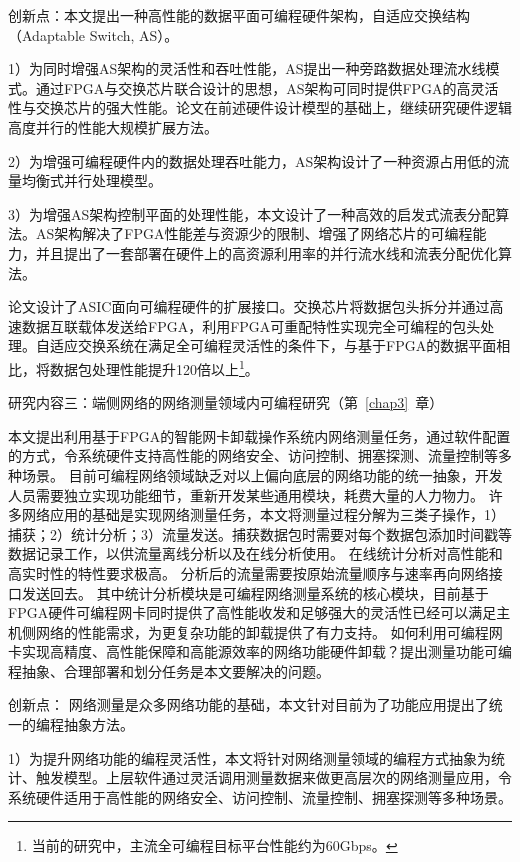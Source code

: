{\hei 创新点：}本文提出一种高性能的数据平面可编程硬件架构，自适应交换结构（Adaptable Switch, AS）。

1）为同时增强AS架构的灵活性和吞吐性能，AS提出一种旁路数据处理流水线模式。通过FPGA与交换芯片联合设计的思想，AS架构可同时提供FPGA的高灵活性与交换芯片的强大性能。论文在前述硬件设计模型的基础上，继续研究硬件逻辑高度并行的性能大规模扩展方法。

2）为增强可编程硬件内的数据处理吞吐能力，AS架构设计了一种资源占用低的流量均衡式并行处理模型。

3）为增强AS架构控制平面的处理性能，本文设计了一种高效的启发式流表分配算法。AS架构解决了FPGA性能差与资源少的限制、增强了网络芯片的可编程能力，并且提出了一套部署在硬件上的高资源利用率的并行流水线和流表分配优化算法。

论文设计了ASIC面向可编程硬件的扩展接口。交换芯片将数据包头拆分并通过高速数据互联载体发送给FPGA，利用FPGA可重配特性实现完全可编程的包头处理。自适应交换系统在满足全可编程灵活性的条件下，与基于FPGA的数据平面相比，将数据包处理性能提升120倍以上\footnote{当前的研究中，主流全可编程目标平台性能约为60Gbps。}。

{\hei 研究内容三：端侧网络的网络测量领域内可编程研究（第~\ref{chap3}~章）}

{\hei 本文提出利用基于FPGA的智能网卡卸载操作系统内网络测量任务，通过软件配置的方式，令系统硬件支持高性能的网络安全、访问控制、拥塞探测、流量控制等多种场景。}
目前可编程网络领域缺乏对以上偏向底层的网络功能的统一抽象，开发人员需要独立实现功能细节，重新开发某些通用模块，耗费大量的人力物力。
许多网络应用的基础是实现网络测量任务，本文将测量过程分解为三类子操作，1）捕获；2）统计分析；3）流量发送。捕获数据包时需要对每个数据包添加时间戳等数据记录工作，以供流量离线分析以及在线分析使用。
在线统计分析对高性能和高实时性的特性要求极高。
分析后的流量需要按原始流量顺序与速率再向网络接口发送回去。
其中统计分析模块是可编程网络测量系统的核心模块，目前基于FPGA硬件可编程网卡同时提供了高性能收发和足够强大的灵活性已经可以满足主机侧网络的性能需求，为更复杂功能的卸载提供了有力支持。
如何利用可编程网卡实现高精度、高性能保障和高能源效率的网络功能硬件卸载？提出测量功能可编程抽象、合理部署和划分任务是本文要解决的问题。

{\hei 创新点：}
网络测量是众多网络功能的基础，本文针对目前为了功能应用提出了统一的编程抽象方法。

1）为提升网络功能的编程灵活性，本文将针对网络测量领域的编程方式抽象为统计、触发模型。上层软件通过灵活调用测量数据来做更高层次的网络测量应用，令系统硬件适用于高性能的网络安全、访问控制、流量控制、拥塞探测等多种场景。

